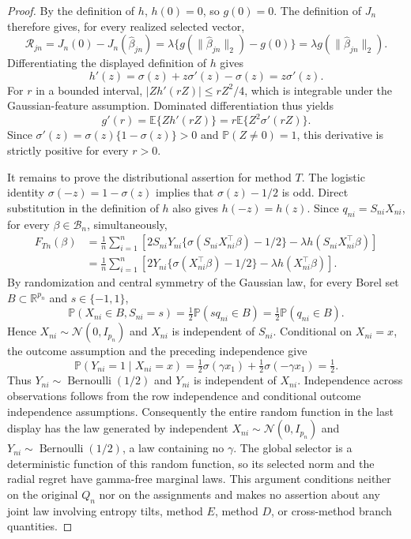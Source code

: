 \documentclass{article}
\begin{document}
\begin{proof}
By the definition of \(h\), \(h(0)=0\), so \(g(0)=0\).  The definition of \(J_n\) therefore gives, for every realized selected vector,
\[
 \mathcal R_{jn}=J_n(0)-J_n(\widehat\beta_{jn})
 =\lambda\{g(\|\widehat\beta_{jn}\|_2)-g(0)\}
 =\lambda g(\|\widehat\beta_{jn}\|_2).
\]
Differentiating the displayed definition of \(h\) gives
\[
 h'(z)=\sigma(z)+z\sigma'(z)-\sigma(z)=z\sigma'(z).
\]
For \(r\) in a bounded interval, \(|Z h'(rZ)|\le rZ^2/4\), which is integrable under the Gaussian-feature assumption.  Dominated differentiation thus yields
\[
 g'(r)=\mathbb E\{Zh'(rZ)\}
       =r\mathbb E\{Z^2\sigma'(rZ)\}.
\]
Since \(\sigma'(z)=\sigma(z)\{1-\sigma(z)\}>0\) and \(\mathbb P(Z\ne0)=1\), this derivative is strictly positive for every \(r>0\).

It remains to prove the distributional assertion for method \(T\).  The logistic identity \(\sigma(-z)=1-\sigma(z)\) implies that \(\sigma(z)-1/2\) is odd.  Direct substitution in the definition of \(h\) also gives \(h(-z)=h(z)\).  Since \(q_{ni}=S_{ni}X_{ni}\), for every \(\beta\in\mathcal B_n\), simultaneously,
\[
 \begin{aligned}
 F_{Tn}(\beta)
 &=\frac1n\sum_{i=1}^n
 \left[2S_{ni}Y_{ni}\{\sigma(S_{ni}X_{ni}^{\top}\beta)-1/2\}
       -\lambda h(S_{ni}X_{ni}^{\top}\beta)\right]\\
 &=\frac1n\sum_{i=1}^n
 \left[2Y_{ni}\{\sigma(X_{ni}^{\top}\beta)-1/2\}
       -\lambda h(X_{ni}^{\top}\beta)\right].
 \end{aligned}
\]
By randomization and central symmetry of the Gaussian law, for every Borel set \(B\subset\mathbb R^{p_n}\) and \(s\in\{-1,1\}\),
\[
 \mathbb P(X_{ni}\in B,S_{ni}=s)
 =\tfrac12\mathbb P(sq_{ni}\in B)
 =\tfrac12\mathbb P(q_{ni}\in B).
\]
Hence \(X_{ni}\sim\mathcal N(0,I_{p_n})\) and \(X_{ni}\) is independent of \(S_{ni}\).  Conditional on \(X_{ni}=x\), the outcome assumption and the preceding independence give
\[
 \mathbb P(Y_{ni}=1\mid X_{ni}=x)
 =\tfrac12\sigma(\gamma x_1)+\tfrac12\sigma(-\gamma x_1)=\tfrac12.
\]
Thus \(Y_{ni}\sim\operatorname{Bernoulli}(1/2)\) and \(Y_{ni}\) is independent of \(X_{ni}\).  Independence across observations follows from the row independence and conditional outcome independence assumptions.  Consequently the entire random function in the last display has the law generated by independent \(X_{ni}\sim\mathcal N(0,I_{p_n})\) and \(Y_{ni}\sim\operatorname{Bernoulli}(1/2)\), a law containing no \(\gamma\).  The global selector is a deterministic function of this random function, so its selected norm and the radial regret have gamma-free marginal laws.  This argument conditions neither on the original \(Q_n\) nor on the assignments and makes no assertion about any joint law involving entropy tilts, method \(E\), method \(D\), or cross-method branch quantities.
\end{proof}
\end{document}
